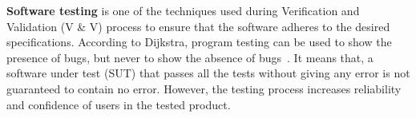 


{\textbf {Software testing}} is one of the techniques used during Verification and Validation (V \& V) process to ensure that the software adheres to the desired specifications. According to Dijkstra, program testing can be used to show the presence of bugs, but never to show the absence of bugs~\cite{dahl1972structured}. It means that, a software under test (SUT) that passes all the tests without giving any error is not guaranteed to contain no error. However, the testing process increases reliability and confidence of users in the tested product.

